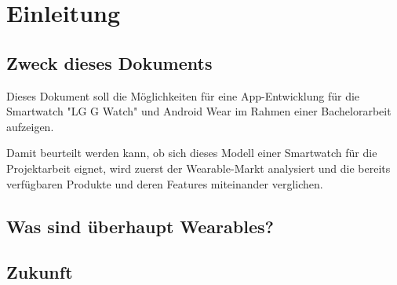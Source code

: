\section{Einleitung}
\label{sec:einleitung}

\subsection{Zweck dieses Dokuments}
Dieses Dokument soll die Möglichkeiten für eine App-Entwicklung für die Smartwatch "LG G Watch" und Android Wear im Rahmen einer Bachelorarbeit aufzeigen.

Damit beurteilt werden kann, ob sich dieses Modell einer Smartwatch für die Projektarbeit eignet, wird zuerst der Wearable-Markt analysiert und die bereits verfügbaren Produkte und deren Features miteinander verglichen.

\subsection{Was sind überhaupt Wearables?}


\subsection{Zukunft}
\newpage